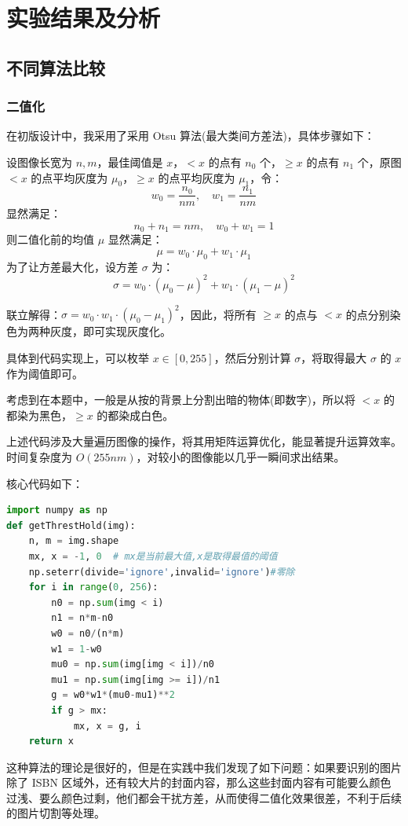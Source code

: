\documentclass{ctexart}
\begin{document}
\section{实验结果及分析}
\subsection{不同算法比较}

\subsubsection{二值化}
在初版设计中，我采用了采用 Otsu 算法(最大类间方差法)，具体步骤如下：

设图像长宽为 $n,m$，最佳阈值是 $x$，$< x$ 的点有 $n_0$ 个，$\ge x$ 的点有 $n_1$ 个，原图 $< x$ 的点平均灰度为 $\mu_0$，$\ge x$ 的点平均灰度为 $\mu_1$，令：
\[w_0=\frac{n_0}{nm},\quad w_1=\frac{n_1}{nm}\]
显然满足：
\[n_0+n_1=nm,\quad w_0+w_1=1\]
则二值化前的均值 $\mu$ 显然满足：
\[\mu=w_0\cdot\mu_0+w_1\cdot\mu_1\]
为了让方差最大化，设方差 $\sigma$ 为：
\[\sigma=w_0\cdot(\mu_0-\mu)^2+w_1\cdot(\mu_1-\mu)^2\]

联立解得：$\sigma=w_0\cdot w_1\cdot (\mu_0-\mu_1)^2$，因此，将所有 $\ge x$ 的点与 $< x$ 的点分别染色为两种灰度，即可实现灰度化。

具体到代码实现上，可以枚举 $x\in[0,255]$，然后分别计算 $\sigma$，将取得最大 $\sigma$ 的 $x$ 作为阈值即可。

考虑到在本题中，一般是从按的背景上分割出暗的物体(即数字)，所以将 $< x$ 的都染为黑色，$\ge x$ 的都染成白色。

上述代码涉及大量遍历图像的操作，将其用矩阵运算优化，能显著提升运算效率。时间复杂度为 $O(255nm)$，对较小的图像能以几乎一瞬间求出结果。

核心代码如下：
\begin{lstlisting}[language=python]
import numpy as np
def getThrestHold(img):
    n, m = img.shape
    mx, x = -1, 0  # mx是当前最大值,x是取得最值的阈值
    np.seterr(divide='ignore',invalid='ignore')#零除
    for i in range(0, 256):
        n0 = np.sum(img < i)
        n1 = n*m-n0
        w0 = n0/(n*m)
        w1 = 1-w0
        mu0 = np.sum(img[img < i])/n0
        mu1 = np.sum(img[img >= i])/n1
        g = w0*w1*(mu0-mu1)**2
        if g > mx:
            mx, x = g, i
    return x
\end{lstlisting}

这种算法的理论是很好的，但是在实践中我们发现了如下问题：如果要识别的图片除了 ISBN 区域外，还有较大片的封面内容，那么这些封面内容有可能要么颜色过浅、要么颜色过剩，他们都会干扰方差，从而使得二值化效果很差，不利于后续的图片切割等处理。
\end{document}
